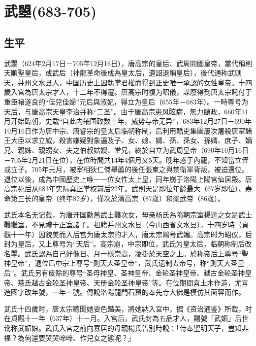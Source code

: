 
\section{武曌\tiny(683-705)}

\subsection{生平}

武曌（624年2月17日－705年12月16日），唐高宗的皇后、武周開國皇帝，當代稱則天順聖皇后，或武后（神龍革命後成為皇太后，遺詔退稱皇后），後代通称武则天，并州文水县人，中国历史上因執掌君權而得到正史唯一承認的女性皇帝。十四歲入宮為唐太宗才人，十二年不得遷。唐高宗时復为昭儀，謀廢得到唐太宗託付于重臣褚遂良的“佳兒佳婦”元后與淑妃，得立为皇后（655年－683年）。一時尊号为天后，与唐高宗天皇李治并称“二圣”。由于唐高宗患风眩病，無力聽政，660年11月开始臨朝，史载“自此内辅国政数十年，威势与帝无异”，683年12月27日－690年10月16日作为唐中宗、唐睿宗的皇太后临朝称制，后利用酷吏集團屢次屠殺唐室諸王大臣以求立威，殺害嫌疑對象遍及子、女、媳、婿、孫、孫女、孫婿、庶子、嫡兄、親姊、親甥女、夫之伯叔姑嫂、堂兄，終於自立为武周皇帝（690年10月16日－705年2月21日在位），在位時間共14年4個月又5天。晚年惑于內寵，不知當立侄或立子。705年元月，被宰相狄仁傑舉薦的後任張柬之與禁衛軍背叛，被迫還位。退位以後，成為中國歷史上唯一一位女性太上皇，同年崩于洛陽上陽宮仙居殿。唐高宗死后从683年实际真正掌权前后22年。武則天是即位年龄最大（67岁即位）、寿命第三长的皇帝（终年82岁），僅次於清高宗（87歲）和梁武帝（86歲）。

武氏本名无记载，为唐开国勳舊武士彠次女，母亲杨氏為隋朝宗室楊達之女是武士彠繼室，不見禮于正室諸子。祖籍并州文水县（今山西省文水县），十四岁時（貞觀十一年）因貌美而入后宫为唐太宗的才人，唐太宗赐号武媚。高宗时为昭仪，后封为皇后，又上尊号为“天后”。高宗崩，中宗即位，武氏为皇太后，临朝称制后改名曌。武氏認為自己好像日、月一樣崇高，凌掛於天空之上。於称帝后上尊号“聖神皇帝”，退位后中宗上尊号“则天大圣皇帝”，武氏遗制去帝号，称“则天大圣皇后”。武氏另有废除的尊号“圣母神皇、圣神皇帝、金轮圣神皇帝、越古金轮圣神皇帝、慈氏越古金轮圣神皇帝、天册金轮圣神皇帝”等。在位期間喜土木作造，尤喜造國字改年號，一年一號。傳說洛陽龍門石窟的奉先寺大佛是模仿其面容而作。

武氏十四歲时，唐太宗聽聞她姿色豔美，將她納入宮中，据《资治通鉴》所载，时在貞觀十一年（637年）十一月。入宫后，武氏封為五品才人，賜號「武媚」后世讹称武媚娘。武氏入宮之前向寡居的母親楊氏告別時說：「侍奉聖明天子，豈知非福？為何還要哭哭啼啼、作兒女之態呢？」


